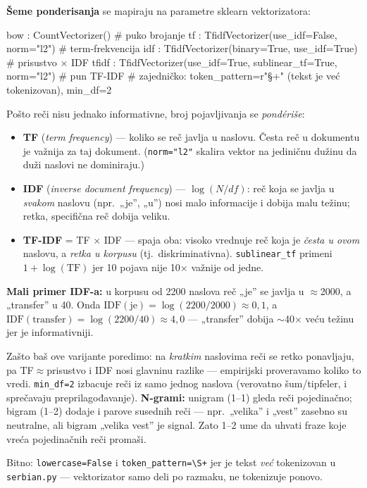 \documentclass[11pt,a4paper]{article}
\newcommand{\kod}[1]{\texttt{#1}}
\begin{document}
\textbf{Šeme ponderisanja} se mapiraju na parametre sklearn vektorizatora:
\begin{code}
bow   : CountVectorizer()                              # puko brojanje
tf    : TfidfVectorizer(use_idf=False, norm="l2")      # term-frekvencija
idf   : TfidfVectorizer(binary=True, use_idf=True)     # prisustvo × IDF
tfidf : TfidfVectorizer(use_idf=True, sublinear_tf=True, norm="l2")  # pun TF-IDF
# zajedničko: token_pattern=r"\S+"  (tekst je već tokenizovan), min_df=2
\end{code}
\begin{teorija}
Pošto reči nisu jednako informativne, broj pojavljivanja se \emph{pondériše}:
\begin{itemize}[nosep]
  \item \textbf{TF} (\emph{term frequency}) --- koliko se reč javlja u naslovu. Česta
    reč u dokumentu je važnija za taj dokument. (\kod{norm="l2"} skalira vektor na
    jediničnu dužinu da duži naslovi ne dominiraju.)
  \item \textbf{IDF} (\emph{inverse document frequency}) --- $\log(N/df)$: reč koja se
    javlja u \emph{svakom} naslovu (npr.\ „je'', „u'') nosi malo informacije i dobija
    malu težinu; retka, specifična reč dobija veliku.
  \item \textbf{TF-IDF} = TF $\times$ IDF --- spaja oba: visoko vrednuje reč koja je
    \emph{česta u ovom} naslovu, a \emph{retka u korpusu} (tj.\ diskriminativna).
    \kod{sublinear\_tf} primeni $1+\log(\mathrm{TF})$ jer 10 pojava nije 10$\times$
    važnije od jedne.
\end{itemize}
\textbf{Mali primer IDF-a:} u korpusu od 2200 naslova reč „je'' se javlja u
$\approx$2000, a „transfer'' u 40. Onda $\mathrm{IDF}(\text{je})=\log(2200/2000)\approx
0{,}1$, a $\mathrm{IDF}(\text{transfer})=\log(2200/40)\approx 4{,}0$ --- „transfer''
dobija $\sim$40$\times$ veću težinu jer je informativniji.

\medskip
Zašto baš ove varijante poredimo: na \emph{kratkim} naslovima reči se retko ponavljaju,
pa TF$\approx$prisustvo i IDF nosi glavninu razlike --- empirijski proveravamo koliko
to vredi. \kod{min\_df=2} izbacuje reči iz samo jednog naslova (verovatno šum/tipfeler,
i sprečavaju preprilagođavanje). \textbf{N-grami:} unigram (1--1) gleda reči pojedinačno;
bigram (1--2) dodaje i parove susednih reči --- npr.\ „velika'' i „vest'' zasebno su
neutralne, ali bigram „velika vest'' je signal. Zato 1--2 ume da uhvati fraze koje
vreća pojedinačnih reči promaši.
\end{teorija}
Bitno: \kod{lowercase=False} i \kod{token\_pattern=\textbackslash S+} jer je tekst
\emph{već} tokenizovan u \kod{serbian.py} --- vektorizator samo deli po razmaku, ne
tokenizuje ponovo.
\end{document}
